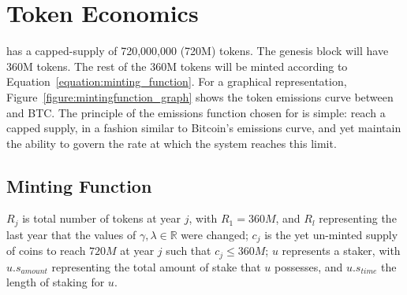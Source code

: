\documentclass[runningheads]{llncs}
\begin{document}
\section{Token Economics}

\AVATokenName{} has a capped-supply of 720,000,000 (720M) tokens. The genesis block will have 360M \AVATokenName{} tokens. The rest of the  360M tokens will be minted according to Equation~\ref{equation:minting_function}. For a graphical representation, Figure~\ref{figure:mintingfunction_graph} shows the token emissions curve between \AVATokenName{} and BTC. The principle of the emissions function chosen for \AVAPlatformName{} is simple: reach a capped supply, in a fashion similar to Bitcoin's emissions curve, and yet maintain the ability to govern the rate at which the system reaches this limit.

\subsection{Minting Function}

$R_j$ is total number of tokens at year $j$, with $R_1 = 360M$, and $R_l$ representing the last year that the values of $\gamma, \lambda \in \mathbb{R}$ were changed; $c_j$ is the yet un-minted supply of coins to reach $720M$ at year $j$ such that $c_j \leq 360M$; $u$ represents a staker, with $u.s_{amount}$ representing the total amount of stake that $u$ possesses, and $u.s_{time}$ the length of staking for $u$.
\end{document}
